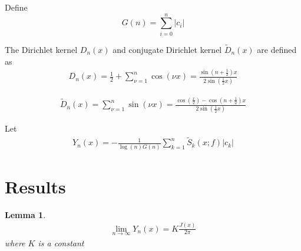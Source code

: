 \documentclass{amsart}
\newtheorem{lemma}[theorem]{Lemma}
\theoremstyle{definition}
\theoremstyle{remark}
\numberwithin{equation}{section}
\begin{document}
Define $$G(n) = \sum_{i=0}^{n}\left|c_i\right|$$

The Dirichlet kernel $D_n(x)$ and conjugate Dirichlet kernel $\tilde{D}_n(x)$ are defined as
\begin{equation}\begin{aligned}
D_n(x) = \frac{1}{2} + \sum_{\nu=1}^{n}\cos(\nu x) = \frac{\sin(n+\frac{1}{2})x}{2\sin(\frac{1}{2}x)}
\end{aligned}\end{equation}

\begin{equation}\begin{aligned}
\tilde{D}_n(x) = \sum_{\nu=1}^{n}\sin(\nu x) = \frac{\cos(\frac{x}{2})-\cos(n+\frac{1}{2})x}{2\sin(\frac{1}{2}x)}
\end{aligned}\end{equation}

Let \begin{equation}\begin{aligned}
	Y_n(x) = -\frac{1}{\log(n) G(n)}\sum_{k=1}^{n}\tilde{S}_k(x;f)\left|c_k\right|
	\end{aligned}\end{equation}
\maketitle
\section{Results}
\label{res}

\begin{lemma}
\begin{equation}\begin{aligned}
	\lim_{n\to\infty} Y_n(x) = K\frac{J(x)}{2\pi}
	\end{aligned}\end{equation}	
where $K$ is a constant
\end{lemma}
\end{document}
